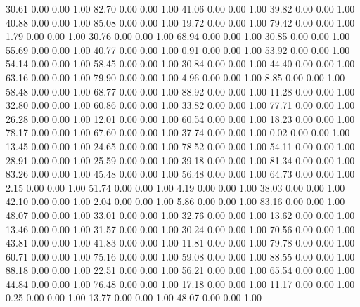    30.61   0.00   0.00   1.00
   82.70   0.00   0.00   1.00
   41.06   0.00   0.00   1.00
   39.82   0.00   0.00   1.00
   40.88   0.00   0.00   1.00
   85.08   0.00   0.00   1.00
   19.72   0.00   0.00   1.00
   79.42   0.00   0.00   1.00
    1.79   0.00   0.00   1.00
   30.76   0.00   0.00   1.00
   68.94   0.00   0.00   1.00
   30.85   0.00   0.00   1.00
   55.69   0.00   0.00   1.00
   40.77   0.00   0.00   1.00
    0.91   0.00   0.00   1.00
   53.92   0.00   0.00   1.00
   54.14   0.00   0.00   1.00
   58.45   0.00   0.00   1.00
   30.84   0.00   0.00   1.00
   44.40   0.00   0.00   1.00
   63.16   0.00   0.00   1.00
   79.90   0.00   0.00   1.00
    4.96   0.00   0.00   1.00
    8.85   0.00   0.00   1.00
   58.48   0.00   0.00   1.00
   68.77   0.00   0.00   1.00
   88.92   0.00   0.00   1.00
   11.28   0.00   0.00   1.00
   32.80   0.00   0.00   1.00
   60.86   0.00   0.00   1.00
   33.82   0.00   0.00   1.00
   77.71   0.00   0.00   1.00
   26.28   0.00   0.00   1.00
   12.01   0.00   0.00   1.00
   60.54   0.00   0.00   1.00
   18.23   0.00   0.00   1.00
   78.17   0.00   0.00   1.00
   67.60   0.00   0.00   1.00
   37.74   0.00   0.00   1.00
    0.02   0.00   0.00   1.00
   13.45   0.00   0.00   1.00
   24.65   0.00   0.00   1.00
   78.52   0.00   0.00   1.00
   54.11   0.00   0.00   1.00
   28.91   0.00   0.00   1.00
   25.59   0.00   0.00   1.00
   39.18   0.00   0.00   1.00
   81.34   0.00   0.00   1.00
   83.26   0.00   0.00   1.00
   45.48   0.00   0.00   1.00
   56.48   0.00   0.00   1.00
   64.73   0.00   0.00   1.00
    2.15   0.00   0.00   1.00
   51.74   0.00   0.00   1.00
    4.19   0.00   0.00   1.00
   38.03   0.00   0.00   1.00
   42.10   0.00   0.00   1.00
    2.04   0.00   0.00   1.00
    5.86   0.00   0.00   1.00
   83.16   0.00   0.00   1.00
   48.07   0.00   0.00   1.00
   33.01   0.00   0.00   1.00
   32.76   0.00   0.00   1.00
   13.62   0.00   0.00   1.00
   13.46   0.00   0.00   1.00
   31.57   0.00   0.00   1.00
   30.24   0.00   0.00   1.00
   70.56   0.00   0.00   1.00
   43.81   0.00   0.00   1.00
   41.83   0.00   0.00   1.00
   11.81   0.00   0.00   1.00
   79.78   0.00   0.00   1.00
   60.71   0.00   0.00   1.00
   75.16   0.00   0.00   1.00
   59.08   0.00   0.00   1.00
   88.55   0.00   0.00   1.00
   88.18   0.00   0.00   1.00
   22.51   0.00   0.00   1.00
   56.21   0.00   0.00   1.00
   65.54   0.00   0.00   1.00
   44.84   0.00   0.00   1.00
   76.48   0.00   0.00   1.00
   17.18   0.00   0.00   1.00
   11.17   0.00   0.00   1.00
    0.25   0.00   0.00   1.00
   13.77   0.00   0.00   1.00
   48.07   0.00   0.00   1.00
